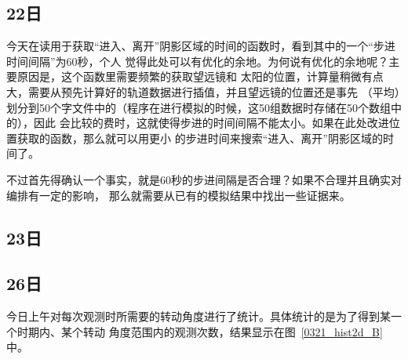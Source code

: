 


\subsection{22日}
今天在读用于获取“进入、离开”阴影区域的时间的函数时，看到其中的一个“步进时间间隔”为60秒，个人
觉得此处可以有优化的余地。为何说有优化的余地呢？主要原因是，这个函数里需要频繁的获取望远镜和
太阳的位置，计算量稍微有点大，需要从预先计算好的轨道数据进行插值，并且望远镜的位置还是事先
（平均）划分到50个字文件中的（程序在进行模拟的时候，这50组数据时存储在50个数组中的），因此
会比较的费时，这就使得步进的时间间隔不能太小。如果在此处改进位置获取的函数，那么就可以用更小
的步进时间来搜索“进入、离开”阴影区域的时间了。

不过首先得确认一个事实，就是60秒的步进间隔是否合理？如果不合理并且确实对编排有一定的影响，
那么就需要从已有的模拟结果中找出一些证据来。


\subsection{23日}


\subsection{26日}
今日上午对每次观测时所需要的转动角度进行了统计。具体统计的是为了得到某一个时期内、某个转动
角度范围内的观测次数，结果显示在图~\ref{0321_hist2d_B}中。

